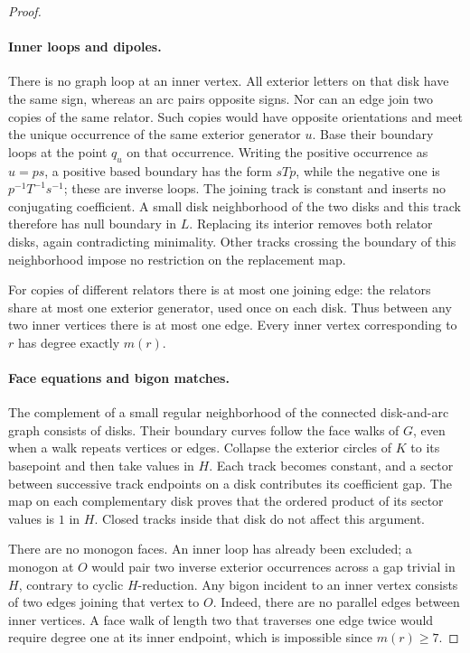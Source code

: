 \begin{proof}
\paragraph{Inner loops and dipoles.}
There is no graph loop at an inner vertex.  All exterior letters on
that disk have the same sign, whereas an arc pairs opposite signs.
Nor can an edge join two copies of the same relator.  Such copies would
have opposite orientations and meet the unique occurrence of the same
exterior generator $u$.  Base their boundary loops at the point $q_u$
on that occurrence.  Writing the positive occurrence as $u=ps$, a
positive based boundary has the form $sTp$, while the negative one is
$p^{-1}T^{-1}s^{-1}$; these are inverse loops.  The joining track is
constant and inserts no conjugating coefficient.  A small disk
neighborhood of the two disks and this track therefore has null
boundary in $L$.  Replacing its interior removes both relator disks,
again contradicting minimality.  Other tracks crossing the boundary of
this neighborhood impose no restriction on the replacement map.

For copies of different relators there is at most one joining edge:
the relators share at most one exterior generator, used once on each
disk.  Thus between any two inner vertices there is at most one edge.
Every inner vertex corresponding to $r$ has degree exactly $m(r)$.

\paragraph{Face equations and bigon matches.}
The complement of a small regular neighborhood of the connected
disk-and-arc graph consists of disks.  Their boundary curves follow the
face walks of $G$, even when a walk repeats vertices or edges.  Collapse
the exterior circles of $K$ to its basepoint and then take values in
$H$.  Each track becomes constant, and a sector between successive
track endpoints on a disk contributes its coefficient gap.  The map
on each complementary disk proves that the ordered product of its
sector values is $1$ in $H$.  Closed tracks inside that disk do not
affect this argument.

There are no monogon faces.  An inner loop has already been excluded;
a monogon at $O$ would pair two inverse exterior occurrences across a
gap trivial in $H$, contrary to cyclic $H$-reduction.  Any bigon incident
to an inner vertex consists of two edges joining that vertex to $O$.
Indeed, there are no parallel edges between inner vertices.  A face
walk of length two that traverses one edge twice would require degree
one at its inner endpoint, which is impossible since $m(r)\geq7$.


\end{proof}
